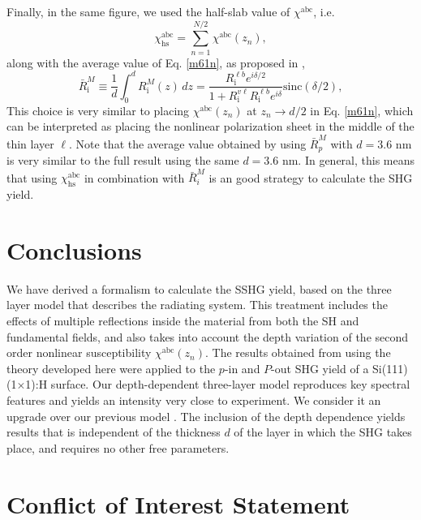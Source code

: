 \documentclass[utf8]{frontiersSCNS}
\begin{document}
Finally, in the same figure, we used the half-slab value of
$\chi^{\mathrm{abc}}$, i.e.
\begin{equation}\label{zp.60}
\chi^{\mathrm{abc}}_{\mathrm{hs}}
=\sum_{n=1}^{N/2}
\chi^{\mathrm{abc}}(z_{n}) ,
\end{equation}  
along with the average value of Eq. \eqref{m61n}, as proposed in
\cite{andersonPRB16b},
\begin{equation}\label{rave}
\bar{R}^{M}_{\mathrm{i}}
\equiv\frac{1}{d}\int^d_0 R^{M}_{\mathrm{i}}(z)\,dz  = 
\frac{R^{\ell b}_{\mathrm{i}}e^{i\delta/2}}
     {1+R^{v\ell}_{\mathrm{i}} R^{\ell b}_{\mathrm{i}}e^{i\delta}}
\mathrm{sinc}(\delta/2),
\end{equation} 
This choice is very similar to placing $\chi^{\mathrm{abc}}(z_{n})$ at $z_{n}
\to d/2$ in Eq. \eqref{m61n}, which can be interpreted as placing the nonlinear
polarization sheet in the middle of the thin layer $\ell$. Note that the average
value obtained by using $\bar{R}^{M}_{p}$ with $d=3.6$ nm is very similar to the
full result using the same $d=3.6$ nm. In general, this means that using
$\chi^{\mathrm{abc}}_{\mathrm{hs}}$ in combination with $\bar{R}^{M}_{i}$ is an
good strategy to calculate the SHG yield.


\section{Conclusions}\label{sec:conclusions}

We have derived a formalism to calculate the SSHG yield, based on the three
layer model that describes the radiating system. This treatment includes the
effects of multiple reflections inside the material from both the SH and
fundamental fields, and also takes into account the depth variation of the
second order nonlinear susceptibility $\chi^{\mathrm{abc}}(z_{n})$. The results
obtained from using the theory developed here were applied to the $p$-in and
$P$-out SHG yield of a Si(111)(1$\times$1):H surface. Our depth-dependent
three-layer model reproduces key spectral features and yields an intensity very
close to experiment. We consider it an upgrade over our previous model
\citep{andersonPRB16b}. The inclusion of the depth dependence yields results
that is independent of the thickness $d$ of the layer in which the SHG takes
place, and requires no other free parameters.


\section*{Conflict of Interest Statement}
\end{document}
